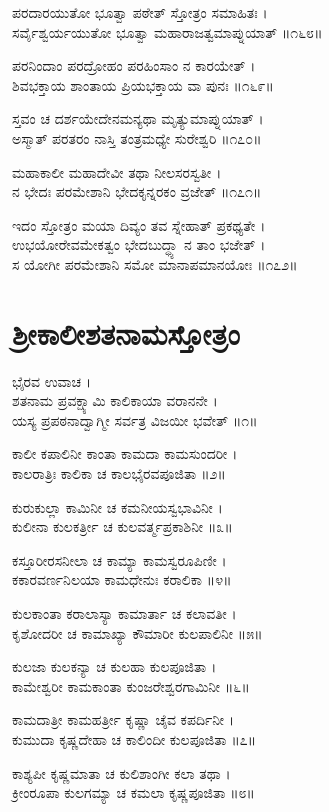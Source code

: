 ಪರದಾರಯುತೋ ಭೂತ್ವಾ ಪಠೇತ್ ಸ್ತೋತ್ರಂ ಸಮಾಹಿತಃ ।\\
ಸರ್ವೈಶ್ವರ್ಯಯುತೋ ಭೂತ್ವಾ ಮಹಾರಾಜತ್ವಮಾಪ್ನುಯಾತ್ ॥೧೬೮॥

ಪರನಿಂದಾಂ ಪರದ್ರೋಹಂ ಪರಹಿಂಸಾಂ ನ ಕಾರಯೇತ್ ।\\
ಶಿವಭಕ್ತಾಯ ಶಾಂತಾಯ ಪ್ರಿಯಭಕ್ತಾಯ ವಾ ಪುನಃ ॥೧೬೯॥

ಸ್ತವಂ ಚ ದರ್ಶಯೇದೇನಮನ್ಯಥಾ ಮೃತ್ಯುಮಾಪ್ನುಯಾತ್ ।\\
ಅಸ್ಮಾತ್ ಪರತರಂ ನಾಸ್ತಿ ತಂತ್ರಮಧ್ಯೇ ಸುರೇಶ್ವರಿ ॥೧೭೦॥

ಮಹಾಕಾಲೀ ಮಹಾದೇವೀ ತಥಾ ನೀಲಸರಸ್ವತೀ ।\\
ನ ಭೇದಃ ಪರಮೇಶಾನಿ ಭೇದಕೃನ್ನರಕಂ ವ್ರಜೇತ್ ॥೧೭೧॥

ಇದಂ ಸ್ತೋತ್ರಂ ಮಯಾ ದಿವ್ಯಂ ತವ ಸ್ನೇಹಾತ್ ಪ್ರಕಥ್ಯತೇ ।\\
ಉಭಯೋರೇವಮೇಕತ್ವಂ ಭೇದಬುದ್ಧ್ಯಾ ನ ತಾಂ ಭಜೇತ್ ।\\
ಸ ಯೋಗೀ ಪರಮೇಶಾನಿ ಸಮೋ ಮಾನಾಪಮಾನಯೋಃ ॥೧೭೨॥

\section{ಶ್ರೀಕಾಲೀಶತನಾಮಸ್ತೋತ್ರಂ}


ಭೈರವ ಉವಾಚ ।\\
ಶತನಾಮ ಪ್ರವಕ್ಷ್ಯಾಮಿ ಕಾಲಿಕಾಯಾ ವರಾನನೇ ।\\
ಯಸ್ಯ ಪ್ರಪಠನಾದ್ವಾಗ್ಮೀ ಸರ್ವತ್ರ ವಿಜಯೀ ಭವೇತ್ ॥೧॥

ಕಾಲೀ ಕಪಾಲಿನೀ ಕಾಂತಾ ಕಾಮದಾ ಕಾಮಸುಂದರೀ ।\\
ಕಾಲರಾತ್ರಿಃ ಕಾಲಿಕಾ ಚ ಕಾಲಭೈರವಪೂಜಿತಾ ॥೨॥

ಕುರುಕುಲ್ಲಾ ಕಾಮಿನೀ ಚ ಕಮನೀಯಸ್ವಭಾವಿನೀ ।\\
ಕುಲೀನಾ ಕುಲಕರ್ತ್ರೀ ಚ ಕುಲವರ್ತ್ಮಪ್ರಕಾಶಿನೀ ॥೩॥

ಕಸ್ತೂರೀರಸನೀಲಾ ಚ ಕಾಮ್ಯಾ ಕಾಮಸ್ವರೂಪಿಣೀ ।\\
ಕಕಾರವರ್ಣನಿಲಯಾ ಕಾಮಧೇನುಃ ಕರಾಲಿಕಾ ॥೪॥

ಕುಲಕಾಂತಾ ಕರಾಲಾಸ್ಯಾ ಕಾಮಾರ್ತಾ ಚ ಕಲಾವತೀ ।\\
ಕೃಶೋದರೀ ಚ ಕಾಮಾಖ್ಯಾ ಕೌಮಾರೀ ಕುಲಪಾಲಿನೀ ॥೫॥

ಕುಲಜಾ ಕುಲಕನ್ಯಾ ಚ ಕುಲಹಾ ಕುಲಪೂಜಿತಾ ।\\
ಕಾಮೇಶ್ವರೀ ಕಾಮಕಾಂತಾ ಕುಂಜರೇಶ್ವರಗಾಮಿನೀ ॥೬॥

ಕಾಮದಾತ್ರೀ ಕಾಮಹರ್ತ್ರೀ ಕೃಷ್ಣಾ ಚೈವ ಕಪರ್ದಿನೀ ।\\
ಕುಮುದಾ ಕೃಷ್ಣದೇಹಾ ಚ ಕಾಲಿಂದೀ ಕುಲಪೂಜಿತಾ ॥೭॥

ಕಾಶ್ಯಪೀ ಕೃಷ್ಣಮಾತಾ ಚ ಕುಲಿಶಾಂಗೀ ಕಲಾ ತಥಾ ।\\
ಕ್ರೀಂರೂಪಾ ಕುಲಗಮ್ಯಾ ಚ ಕಮಲಾ ಕೃಷ್ಣಪೂಜಿತಾ ॥೮॥

